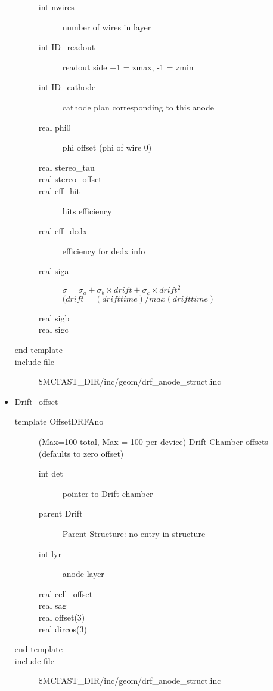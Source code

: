 \begin{itemize}
\begin{description}
\begin{description}
\item[{\rm  int }nwires]   number of wires in layer
\item[{\rm  int} ID\_readout]  readout side +1 = zmax, -1 = zmin
\item[{\rm  int} ID\_cathode]  cathode plan corresponding to this anode
\item[{\rm  real} phi0]  phi offset (phi of wire 0)
\item[{\rm  real} stereo\_tau]  
\item[{\rm  real} stereo\_offset]
\item[{\rm  real} eff\_hit]  hits efficiency 
\item[{\rm  real} eff\_dedx] efficiency for dedx info
\item[{\rm  real} siga]  $ \sigma = \sigma_a + \sigma_b \times drift + \sigma_c \times drift^2 $
$(drift = (drift time)/max(drift time)$
\item[{\rm  real} sigb]
\item[{\rm  real} sigc]
\end{description}
\item[end template]
\item[include file] \$MCFAST\_DIR/inc/geom/drf\_anode\_struct.inc
\end{description}
\item Drift\_offset
\begin{description}
\item[{\rm template} OffsetDRFAno](Max=100 total, Max = 100 per device)  Drift Chamber offsets (defaults to zero offset)
\begin{description}
\item[{\rm  int} det]  pointer to Drift chamber
\item[{\rm  parent} Drift]  Parent Structure: no entry in structure
\item[{\rm  int} lyr]  anode layer
\item[{\rm  real} cell\_offset]  
\item[{\rm  real} sag]
\item[{\rm  real} offset(3)]
\item[{\rm  real} dircos(3)]
\end{description}
\item[end template]
\item[include file] \$MCFAST\_DIR/inc/geom/drf\_anode\_struct.inc
\end{description}
\end{itemize}

\filbreak


